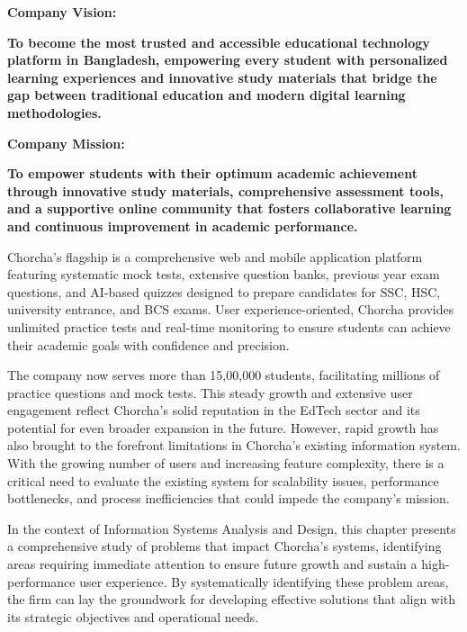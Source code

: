 \documentclass[12pt,a4paper,oneside]{book}
\begin{document}
\vspace{0.5cm}

\textbf{\textcolor{chapterblue}{Company Vision:}} \\
\colorbox{chapterblue!10}{\parbox{0.95\textwidth}{\textcolor{chapterblue}{\textbf{To become the most trusted and accessible educational technology platform in Bangladesh, empowering every student with personalized learning experiences and innovative study materials that bridge the gap between traditional education and modern digital learning methodologies.}}}}

\vspace{0.5cm}

\textbf{\textcolor{chapterblue}{Company Mission:}} \\
\colorbox{chapterblue!10}{\parbox{0.95\textwidth}{\textcolor{chapterblue}{\textbf{To empower students with their optimum academic achievement through innovative study materials, comprehensive assessment tools, and a supportive online community that fosters collaborative learning and continuous improvement in academic performance.}}}}

\vspace{0.5cm}

Chorcha's flagship is a comprehensive web and mobile application platform featuring systematic mock tests, extensive question banks, previous year exam questions, and AI-based quizzes designed to prepare candidates for SSC, HSC, university entrance, and BCS exams. User experience-oriented, Chorcha provides unlimited practice tests and real-time monitoring to ensure students can achieve their academic goals with confidence and precision.

The company now serves more than 15,00,000 students, facilitating millions of practice questions and mock tests. This steady growth and extensive user engagement reflect Chorcha's solid reputation in the EdTech sector and its potential for even broader expansion in the future. However, rapid growth has also brought to the forefront limitations in Chorcha's existing information system. With the growing number of users and increasing feature complexity, there is a critical need to evaluate the existing system for scalability issues, performance bottlenecks, and process inefficiencies that could impede the company's mission.

In the context of Information Systems Analysis and Design, this chapter presents a comprehensive study of problems that impact Chorcha's systems, identifying areas requiring immediate attention to ensure future growth and sustain a high-performance user experience. By systematically identifying these problem areas, the firm can lay the groundwork for developing effective solutions that align with its strategic objectives and operational needs.
\end{document}
